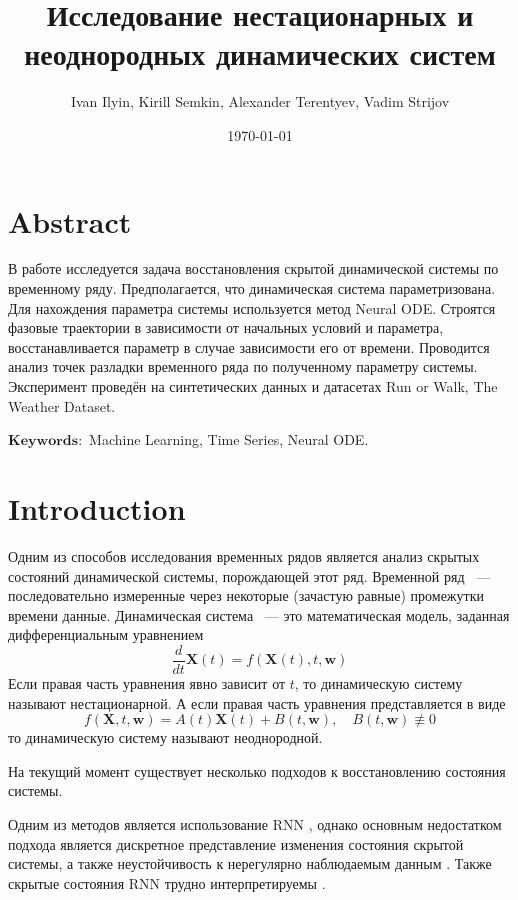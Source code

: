 \documentclass[a4paper,14pt]{article}
\author{Ivan Ilyin, Kirill Semkin, Alexander Terentyev, Vadim Strijov}
\title{\textbf{Исследование нестационарных и неоднородных динамических систем}}
\date{\today}
\theoremstyle{plain} %
\theoremstyle{definition} %
\theoremstyle{remark} %
\begin{document}
	\maketitle
	\section{Abstract}
	В работе исследуется задача восстановления скрытой динамической системы по временному ряду. Предполагается, что динамическая система параметризована. Для нахождения параметра системы используется метод Neural ODE. Строятся фазовые траектории в зависимости от начальных условий и параметра, восстанавливается параметр в случае зависимости его от времени. Проводится анализ точек разладки временного ряда по полученному параметру системы. Эксперимент проведён на синтетических данных и датасетах Run or Walk, The Weather Dataset.

	$\mathbf{Keywords:}$ Machine Learning, Time Series, Neural ODE.
        
	\section{Introduction}
        Одним из способов исследования временных рядов является анализ скрытых состояний динамической системы, порождающей этот ряд. Временной ряд ~--- последовательно измеренные через некоторые (зачастую равные) промежутки времени данные. Динамическая система ~--- это математическая модель, заданная дифференциальным уравнением 
        \begin{equation}
            \frac{d}{dt}\mathbf{X}(t) = f(\mathbf{X}(t), t, \mathbf{w})
        \end{equation}
        Если правая часть уравнения явно зависит от $t$, то динамическую систему называют нестационарной. А если правая часть уравнения представляется в виде
        \begin{equation}
        f(\mathbf{X}, t, \mathbf{w}) = A(t)\mathbf{X}(t) + B(t, \mathbf{w}), \quad B(t, \mathbf{w}) \not\equiv 0
        \end{equation} то динамическую систему называют неоднородной.
        
        На текущий момент существует несколько подходов к восстановлению состояния системы.

        Одним из методов является использование RNN \citep{strobelt2017lstmvis}, однако основным недостатком подхода является дискретное представление изменения состояния скрытой системы, а также неустойчивость к нерегулярно наблюдаемым данным \citep{rubanova2019latentodesirregularlysampledtime}. Также скрытые состояния RNN трудно интерпретируемы \citep{ming2017understanding} \citep{garcia2021visual}.
\end{document}
